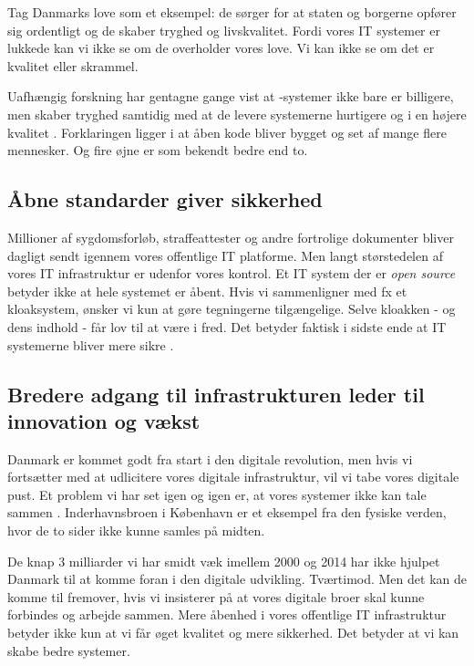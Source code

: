 \documentclass[fleqn]{article}
\begin{document}
Tag Danmarks love som et eksempel: de sørger for at staten og borgerne opfører sig 
ordentligt og de skaber tryghed og livskvalitet. Fordi vores IT systemer er lukkede
kan vi ikke se om de overholder vores love. Vi kan ikke se om det er kvalitet eller skrammel.

Uafhængig forskning har gentagne gange vist at -systemer ikke bare er billigere,
men skaber tryghed samtidig med at de levere systemerne hurtigere og i en højere kvalitet \cite{Samoladas, Reynolds}.
Forklaringen ligger i at åben kode bliver bygget og set af mange flere mennesker. Og fire
øjne er som bekendt bedre end to.

\subsection{Åbne standarder giver sikkerhed}

Millioner af sygdomsforløb, straffeattester og andre fortrolige
dokumenter bliver dagligt sendt igennem vores offentlige IT platforme. Men langt størstedelen
af vores IT infrastruktur er udenfor vores kontrol.
Et IT system der er \textit{open source} betyder ikke at hele systemet er åbent. 
Hvis vi sammenligner med fx et kloaksystem, ønsker vi kun at gøre tegningerne
tilgængelige. Selve kloakken - og dens indhold - får lov til at være i fred.
Det betyder faktisk i sidste ende at IT systemerne bliver mere sikre \cite{Samoladas, Reynolds}.

\subsection{Bredere adgang til infrastrukturen leder til innovation og vækst}

Danmark er kommet godt fra start i den digitale revolution, men hvis vi fortsætter
med at udlicitere vores digitale infrastruktur, vil vi tabe vores digitale pust.
Et problem vi har set igen og igen er, at vores systemer ikke kan tale sammen
\cite{ITU, Lauesen}. Inderhavnsbroen i København er et eksempel fra den
fysiske verden, hvor de to sider ikke kunne samles på midten.

De knap 3 milliarder vi har smidt væk imellem 2000 og 2014 har ikke hjulpet Danmark til
at komme foran i den digitale udvikling. Tværtimod. Men det kan de komme til fremover, hvis vi
insisterer på at vores digitale broer skal kunne forbindes og arbejde sammen.
Mere åbenhed i vores offentlige IT infrastruktur betyder ikke kun at vi får øget
kvalitet og mere sikkerhed. Det betyder at vi kan skabe bedre systemer.
\end{document}
